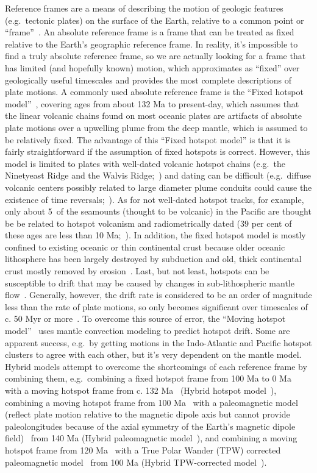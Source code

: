 Reference frames are a means of describing the motion of geologic features
(e.g.\ tectonic plates) on the surface of the Earth, relative to a common point
or ``frame''~\cite{Sh12}. An absolute reference frame is a frame that can be
treated as fixed relative to the Earth's geographic reference frame. In reality,
it's impossible to find a truly absolute reference frame, so we are actually
looking for a frame that has limited (and hopefully known) motion, which
approximates as ``fixed'' over geologically useful timescales and provides the
most complete descriptions of plate motions. A commonly used absolute reference
frame is the ``Fixed hotspot model''~\cite{M93,M99}, covering ages from about
132 Ma to present-day, which assumes that the linear volcanic chains found on
most oceanic plates are artifacts of absolute plate motions over a upwelling
plume from the deep mantle, which is assumed to be relatively fixed. The
advantage of this ``Fixed hotspot model'' is that it is fairly straightforward
if the assumption of fixed hotspots is correct. However, this model is limited
to plates with well-dated volcanic hotspot chains (e.g.\ the Ninetyeast Ridge
and the Walvis Ridge;~\cite{O05}) and dating can be difficult (e.g.\ diffuse
volcanic centers possibly related to large diameter plume conduits could cause
the existence of time reversals;~\cite{O05}). As for not well-dated hotspot
tracks, for example, only about 5\textperthousand\ of the seamounts (thought to
be volcanic) in the Pacific are thought be be related to hotspot volcanism and
radiometrically dated (39 per cent of these ages are less than 10
Ma;~\cite{H07}). In addition, the fixed hotspot model is mostly confined to
existing oceanic or thin continental crust because older oceanic lithosphere
has been largely destroyed by subduction and old, thick continental crust mostly
removed by erosion~\cite{C13}. Last, but not least, hotspots can be susceptible
to drift that may be caused by changes in sub-lithospheric mantle
flow~\cite{T09}. Generally, however, the drift rate is considered to be an order
of magnitude less than the rate of plate motions, so only becomes significant
over timescales of c. 50 Myr or more~\cite{O05,T07}. To overcome this source of
error, the ``Moving hotspot model''~\cite{O05} uses mantle convection modeling
to predict hotspot drift. Some are apparent success, e.g.\ by getting motions in
the Indo-Atlantic and Pacific hotspot clusters to agree with each other, but
it's very dependent on the mantle model. Hybrid models attempt to overcome the
shortcomings of each reference frame by combining them, e.g.\ combining a fixed
hotspot frame from 100 Ma to 0 Ma~\cite{M93} with a moving hotspot frame from c.
132 Ma~\cite{O05} (Hybrid hotspot model~\cite{Sh12}), combining a
moving hotspot frame from 100 Ma~\cite{O05} with a paleomagnetic
model (reflect plate motion relative to the magnetic dipole axis but cannot
provide paleolongitudes because of the axial symmetry of the Earth's magnetic
dipole field)~\cite{T08} from 140 Ma (Hybrid paleomagnetic
model~\cite{Sh12}), and combining a moving hotspot frame from 120
Ma~\cite{O05} with a True Polar Wander (TPW) corrected paleomagnetic
model~\cite{S08} from 100 Ma (Hybrid TPW-corrected
model~\cite{Sh12}).

